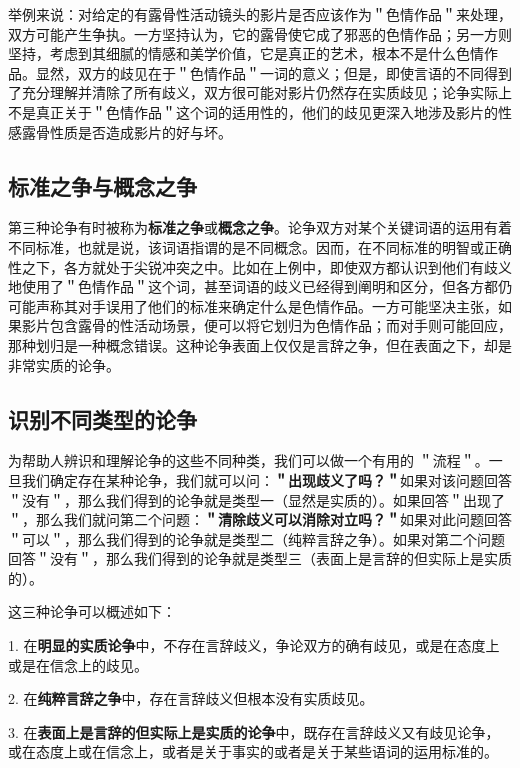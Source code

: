 举例来说：对给定的有露骨性活动镜头的影片是否应该作为＂色情作品＂来处理，双方可能产生争执。一方坚持认为，它的露骨使它成了邪恶的色情作品；另一方则坚持，考虑到其细腻的情感和美学价值，它是真正的艺术，根本不是什么色情作品。显然，双方的歧见在于＂色情作品＂一词的意义；但是，即使言语的不同得到了充分理解并清除了所有歧义，双方很可能对影片仍然存在实质歧见；论争实际上不是真正关于＂色情作品＂这个词的适用性的，他们的歧见更深入地涉及影片的性感露骨性质是否造成影片的好与坏。

\subsection{标准之争与概念之争}

第三种论争有时被称为\textbf{标准之争}或\textbf{概念之争}。论争双方对某个关键词语的运用有着不同标准，也就是说，该词语指谓的是不同概念。因而，在不同标准的明智或正确性之下，各方就处于尖锐冲突之中。比如在上例中，即使双方都认识到他们有歧义地使用了＂色情作品＂这个词，甚至词语的歧义已经得到阐明和区分，但各方都仍可能声称其对手误用了他们的标准来确定什么是色情作品。一方可能坚决主张，如果影片包含露骨的性活动场景，便可以将它划归为色情作品；而对手则可能回应，那种划归是一种概念错误。这种论争表面上仅仅是言辞之争，但在表面之下，却是非常实质的论争。

\subsection{识别不同类型的论争}

为帮助人辨识和理解论争的这些不同种类，我们可以做一个有用的 ＂流程＂。一旦我们确定存在某种论争，我们就可以问：\textbf{＂出现歧义了吗？＂}如果对该问题回答＂没有＂，那么我们得到的论争就是类型一（显然是实质的）。如果回答＂出现了＂，那么我们就问第二个问题：\textbf{＂清除歧义可以消除对立吗？＂}如果对此问题回答＂可以＂，那么我们得到的论争就是类型二（纯粹言辞之争）。如果对第二个问题回答＂没有＂，那么我们得到的论争就是类型三（表面上是言辞的但实际上是实质的）。

这三种论争可以概述如下：

1. 在\textbf{明显的实质论争}中，不存在言辞歧义，争论双方的确有歧见，或是在态度上或是在信念上的歧见。

2. 在\textbf{纯粹言辞之争}中，存在言辞歧义但根本没有实质歧见。

3. 在\textbf{表面上是言辞的但实际上是实质的论争}中，既存在言辞歧义又有歧见论争，或在态度上或在信念上，或者是关于事实的或者是关于某些语词的运用标准的。

\begin{center}
\end{center} 